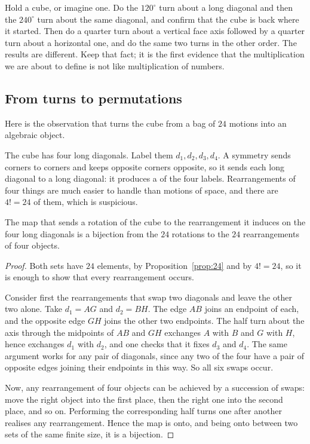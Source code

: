 \begin{tryit}
Hold a cube, or imagine one. Do the $120^\circ$ turn about a long diagonal and then the $240^\circ$
turn about the same diagonal, and confirm that the cube is back where it started. Then do a quarter
turn about a vertical face axis followed by a quarter turn about a horizontal one, and do the same
two turns in the other order. The results are different. Keep that fact; it is the first evidence
that the multiplication we are about to define is not like multiplication of numbers.
\end{tryit}

\subsection{From turns to permutations}

Here is the observation that turns the cube from a bag of $24$ motions into an algebraic object.

The cube has four long diagonals. Label them $d_1,d_2,d_3,d_4$. A symmetry sends corners to corners
and keeps opposite corners opposite, so it sends each long diagonal to a long diagonal: it produces
a  of the four labels. Rearrangements of four things are much easier to handle
than motions of space, and there are $4!=24$ of them, which is suspicious.


\begin{thm}\label{thm:cubeS4}
The map that sends a rotation of the cube to the rearrangement it induces on the four long diagonals
is a bijection from the $24$ rotations to the $24$ rearrangements of four objects.
\end{thm}

\begin{proof}
Both sets have $24$ elements, by Proposition~\ref{prop:24} and by $4!=24$, so it is enough to show
that every rearrangement occurs.

Consider first the rearrangements that swap two diagonals and leave the other two alone. Take
$d_1=AG$ and $d_2=BH$. The edge $AB$ joins an endpoint of each, and the opposite edge $GH$ joins
the other two endpoints. The half turn about the axis through the midpoints of $AB$ and $GH$
exchanges $A$ with $B$ and $G$ with $H$, hence exchanges $d_1$ with $d_2$, and one checks that it
fixes $d_3$ and $d_4$. The same argument works for any pair of diagonals, since any two of the four
have a pair of opposite edges joining their endpoints in this way. So all six swaps occur.

Now, any rearrangement of four objects can be achieved by a succession of swaps: move the right
object into the first place, then the right one into the second place, and so on. Performing the
corresponding half turns one after another realises any rearrangement. Hence the map is onto, and
being onto between two sets of the same finite size, it is a bijection.
\end{proof}

